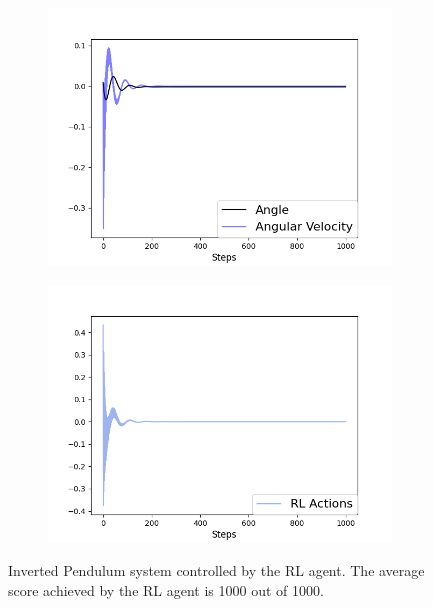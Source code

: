 \begin{figure}
\centering
\begin{subfigure}{0.4\textwidth}
\centering
\includegraphics[width=\linewidth]{ip_RL.png}
\label{fig:ip_pid}
\end{subfigure}%
\begin{subfigure}{.4\textwidth}
\centering
\includegraphics[width=\linewidth]{ip_RL_actions.png}
\label{fig:ip_pid_actions}
\end{subfigure}
\caption{Inverted Pendulum system controlled by the RL agent. The average score achieved by the RL agent is 1000 out of 1000.}
\label{fig:ip_rl}
\end{figure}


